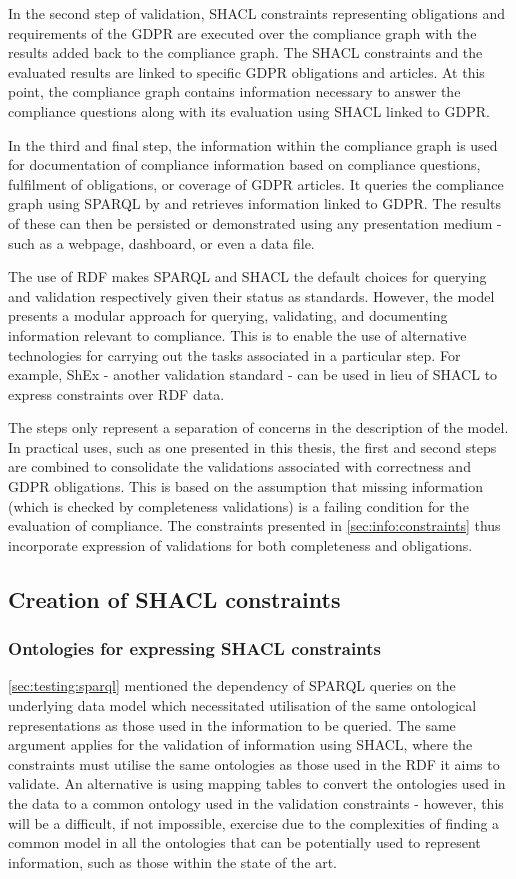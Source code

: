 In the second step of validation, SHACL constraints representing obligations and requirements of the GDPR are executed over the compliance graph with the results added back to the compliance graph.
The SHACL constraints and the evaluated results are linked to specific GDPR obligations and articles.
At this point, the compliance graph contains information necessary to answer the compliance questions along with its evaluation using SHACL linked to GDPR.

In the third and final step, the information within the compliance graph is used for documentation of compliance information based on compliance questions, fulfilment of obligations, or coverage of GDPR articles. It queries the compliance graph using SPARQL by and retrieves information linked to GDPR.
The results of these can then be persisted or demonstrated using any presentation medium - such as a webpage, dashboard, or even a data file.

The use of RDF makes SPARQL and SHACL the default choices for querying and validation respectively given their status as standards.
However, the model presents a modular approach for querying, validating, and documenting information relevant to compliance. This is to enable the use of alternative technologies for carrying out the tasks associated in a particular step. 
For example, ShEx - another validation standard - can be used in lieu of SHACL to express constraints over RDF data.

The steps only represent a separation of concerns in the description of the model.
In practical uses, such as one presented in this thesis, the first and second steps are combined to consolidate the validations associated with correctness and GDPR obligations.
This is based on the assumption that missing information (which is checked by completeness validations) is a failing condition for the evaluation of compliance.
The constraints presented in \autoref{sec:info:constraints} thus incorporate expression of validations for both completeness and obligations.

\subsection{Creation of SHACL constraints}\label{sec:testing:shacl:constraints}
\subsubsection{Ontologies for expressing SHACL constraints}
\autoref{sec:testing:sparql} mentioned the dependency of SPARQL queries on the underlying data model which necessitated utilisation of the same ontological representations as those used in the information to be queried.
The same argument applies for the validation of information using SHACL, where the constraints must utilise the same ontologies as those used in the RDF it aims to validate.
An alternative is using mapping tables to convert the ontologies used in the data to a common ontology used in the validation constraints - however, this will be a difficult, if not impossible, exercise due to the complexities of finding a common model in all the ontologies that can be potentially used to represent information, such as those within the state of the art.

